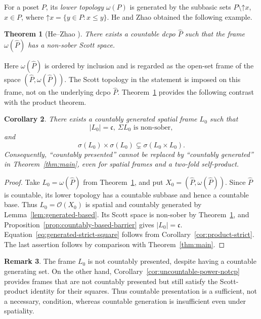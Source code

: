 \documentclass[11pt,reqno]{amsart}
\newtheorem{theorem}{Theorem}[section]
\newtheorem{corollary}[theorem]{Corollary}
\theoremstyle{definition}
\newtheorem{remark}[theorem]{Remark}
\numberwithin{equation}{section}
\newcommand{\OO}{\mathcal O}
\newcommand{\cc}{\mathfrak{c}}
\begin{document}
For a poset $P$, its \emph{lower topology} $\omega(P)$ is generated by the
subbasic sets $P\setminus\mathord{{\uparrow}}x$, $x\in P$, where
$\mathord{{\uparrow}}x=\{y\in P:x\leq y\}$. He and Zhao obtained the
following example.

\begin{theorem}[He--Zhao {\citep[Proposition~4.11]{HeZhao2026}}]
\label{thm:hezhao}
There exists a countable dcpo $\widehat P$ such that the frame
$\omega(\widehat P)$ has a non-sober Scott space.
\end{theorem}

Here $\omega(\widehat P)$ is ordered by inclusion and is regarded as the
open-set frame of the space $(\widehat P,\omega(\widehat P))$. The Scott
topology in the statement is imposed on this frame, not on the underlying
dcpo $\widehat P$. Theorem~\ref{thm:hezhao} provides the following
contrast with the product theorem.

\begin{corollary}\label{cor:generated-counterexample}
There exists a countably generated spatial frame $L_0$ such that
\begin{equation}\label{eq:generated-counterexample}
  |L_0|=\cc,~ \Sigma L_0\text{ is non-sober},
\end{equation}
and
\begin{equation}\label{eq:generated-strict-square}
  \sigma(L_0)\times\sigma(L_0)
  \subsetneq\sigma(L_0\times L_0).
\end{equation}
Consequently, ``countably presented'' cannot be replaced by ``countably
generated'' in Theorem~\ref{thm:main}, even for spatial frames and a
two-fold self-product.
\end{corollary}

\begin{proof}
Take $L_0=\omega(\widehat P)$ from Theorem~\ref{thm:hezhao}, and put
$X_0=(\widehat P,\omega(\widehat P))$. Since $\widehat P$ is countable,
its lower topology has a countable subbase and hence a countable base.
Thus $L_0=\OO(X_0)$ is spatial and countably generated by
Lemma~\ref{lem:generated-based}. Its Scott space is non-sober by
Theorem~\ref{thm:hezhao}, and
Proposition~\ref{prop:countably-based-barrier} gives $|L_0|=\cc$.
Equation~\eqref{eq:generated-strict-square} follows from
Corollary~\ref{cor:product-strict}. The last assertion follows by comparison
with Theorem~\ref{thm:main}.
\end{proof}

\begin{remark}\label{rem:presentation-generation}
The frame $L_0$ is not countably presented, despite having a countable
generating set. On the other hand, Corollary~\ref{cor:uncountable-power-notcp}
provides frames that are not countably presented but still satisfy the
Scott-product identity for their squares. Thus countable presentation is
a sufficient, not a necessary, condition, whereas countable generation
is insufficient even under spatiality.
\end{remark}
\end{document}
